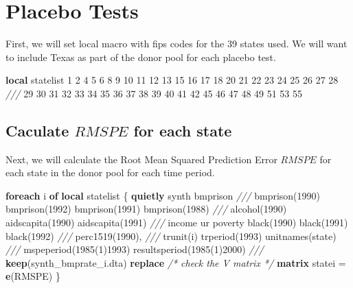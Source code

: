 \documentclass[
]{book}
\newenvironment{Shaded}{\begin{snugshade}}{\end{snugshade}}
\newcommand{\BaseNTok}[1]{\textcolor[rgb]{0.00,0.00,0.81}{#1}}
\newcommand{\CommentTok}[1]{\textcolor[rgb]{0.56,0.35,0.01}{\textit{#1}}}
\newcommand{\FunctionTok}[1]{\textcolor[rgb]{0.13,0.29,0.53}{\textbf{#1}}}
\newcommand{\KeywordTok}[1]{\textcolor[rgb]{0.13,0.29,0.53}{\textbf{#1}}}
\newcommand{\NormalTok}[1]{#1}
\newcommand{\OtherTok}[1]{\textcolor[rgb]{0.56,0.35,0.01}{#1}}
\begin{document}
\section{Placebo Tests}\label{placebo-tests}

First, we will set local macro with fips codes for the 39 states used. We will want to include Texas as part of the donor pool for each placebo test.

\begin{Shaded}
\begin{Highlighting}[]
\KeywordTok{local}\NormalTok{ statelist  1 2 4 5 6 8 9 10 11 12 13 15 16 17 18 20 21 22 23 24 25 26 27 28 }\CommentTok{///}
\NormalTok{                 29 30 31 32 33 34 35 36 37 38 39 40 41 42 45 46 47 48 49 51 53 55 }
\end{Highlighting}
\end{Shaded}

\subsection{\texorpdfstring{Caculate \(RMSPE\) for each state}{Caculate RMSPE for each state}}\label{caculate-rmspe-for-each-state}

Next, we will calculate the Root Mean Squared Prediction Error \(RMSPE\) for each state in the donor pool for each time period.

\begin{Shaded}
\begin{Highlighting}[]
\KeywordTok{foreach}\NormalTok{ i }\KeywordTok{of} \KeywordTok{local}\NormalTok{ statelist \{}
\KeywordTok{quietly}\NormalTok{ synth   bmprison  }\CommentTok{///}
\NormalTok{        bmprison(1990) bmprison(1992) bmprison(1991) bmprison(1988) }\CommentTok{///}
\NormalTok{        alcohol(1990) aidscapita(1990) aidscapita(1991) }\CommentTok{/// }
\NormalTok{        income ur poverty }\BaseNTok{black}\NormalTok{(1990) }\BaseNTok{black}\NormalTok{(1991) }\BaseNTok{black}\NormalTok{(1992) }\CommentTok{///  }
\NormalTok{        perc1519(1990), }\CommentTok{///      }
\NormalTok{            trunit(}\OtherTok{\textasciigrave{}i\textquotesingle{}}\NormalTok{) trperiod(1993) unitnames(state) }\CommentTok{///}
\NormalTok{            mspeperiod(1985(1)1993) resultsperiod(1985(1)2000) }\CommentTok{/// }
            \KeywordTok{keep}\NormalTok{(synth\_bmprate\_}\OtherTok{\textasciigrave{}i\textquotesingle{}}\NormalTok{.dta) }\KeywordTok{replace}
  \CommentTok{/* check the V matrix */}
  \FunctionTok{matrix}\NormalTok{ state}\OtherTok{\textasciigrave{}i\textquotesingle{}}\NormalTok{ = }\FunctionTok{e}\NormalTok{(RMSPE)  }
\NormalTok{\}}
\end{Highlighting}
\end{Shaded}
\end{document}
